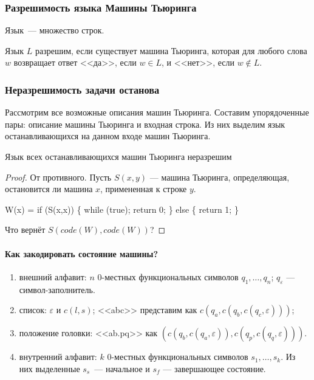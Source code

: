 \subsubsection{Разрешимость языка Машины Тьюринга}

\begin{definition}
    Язык~--- множество строк.
\end{definition}
\begin{definition}
    Язык $L$ разрешим, если существует машина Тьюринга, которая для любого слова $w$ возвращает ответ <<да>>, если $w \in L$,
и <<нет>>, если $w \not\in L$.
\end{definition}

\subsubsection{Неразрешимость задачи останова}
\begin{definition}
    Рассмотрим все возможные описания машин Тьюринга. Составим упорядоченные пары: описание машины Тьюринга и входная строка.
Из них выделим язык останавливающихся на данном входе машин Тьюринга.
\end{definition}

\begin{theorem}
    Язык всех останавливающихся машин Тьюринга неразрешим
\end{theorem}
\begin{proof}
    От противного. Пусть $S(x,y)$ --- машина Тьюринга, определяющая, остановится ли машина $x$, примененная к строке $y$.
\begin{center}
    W(x) = if (S(x,x)) \{ while (true); return 0; \} else \{ return 1; \}
\end{center}
Что вернёт $S(code(W),code(W))$?
\end{proof}

\paragraph{Как закодировать состояние машины?}
\begin{enumerate}
    \item внешний алфавит: $n$ 0-местных функциональных символов $q_1, \dots, q_n$; $q_\varepsilon$ --- символ-заполнитель.
    \item список: $\varepsilon$ и $c(l,s)$; <<abc>> представим как $c(q_a,c(q_b,c(q_c,\varepsilon)))$;
    \item положение головки: <<ab.pq>> как $(c(q_b,c(q_a,\varepsilon)), c(q_p,c(q_q,\varepsilon)))$.
    \item внутренний алфавит: $k$ 0-местных функциональных символов $s_1, \dots, s_k$. Из них выделенные $s_s$~--- начальное и $s_f$ --- завершающее состояние.
\end{enumerate}

